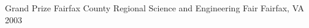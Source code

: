 

\begin{cvhonors}

  \cvhonor
    {Grand Prize} %
    {Fairfax County Regional Science and Engineering Fair} %
    {Fairfax, VA} %
    {2003} %

\end{cvhonors}
